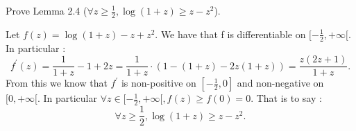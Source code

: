 \begin{exercise}[]{}
	Prove Lemma 2.4 ($ \forall z \geq \frac{1}{2}, \log (1+z) \geq z - z^2 $).
\end{exercise}

\begin{solution}[]
	Let $ f(z) = \log (1+z) - z + z^2 $. We have that f is differentiable on $ [-\frac{1}{2},+\infty[ $. In particular :
\begin{equation*}
	f^{\prime}(z) = \frac{1}{1+z} - 1 + 2z = \frac{1}{1+z}\cdot (1 - (1+z) - 2z(1+z)) = \frac{z(2z+1)}{1+z} .
\end{equation*}
From this we know that $ f^{\prime} $ is non-positive on $ [-\frac{1}{2},0] $ and non-negative on $ [0,+\infty[ $. In particular $ \forall z\in [-\frac{1}{2}, +\infty[, f(z) \geq f(0)=0 $. That is to say :
\begin{equation*}
	\forall z \geq \frac{1}{2}, \log (1+z) \geq z - z^2.
\end{equation*}
\end{solution}
